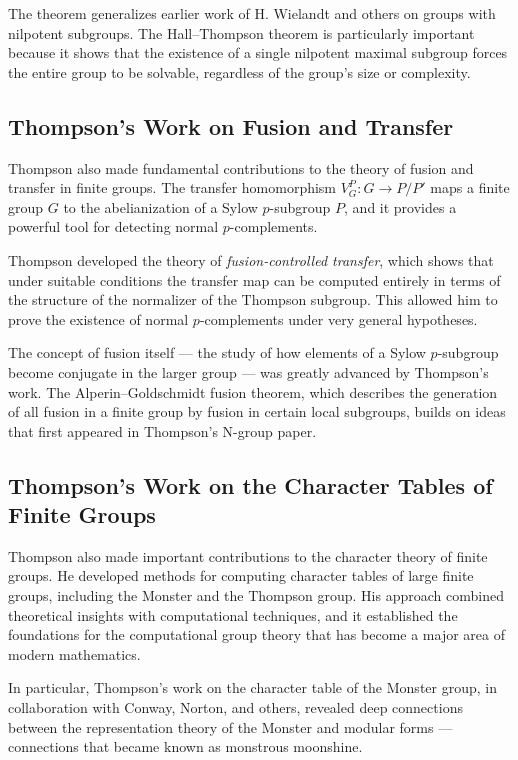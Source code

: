 The theorem generalizes earlier work of H. Wielandt and others on groups with nilpotent subgroups. The Hall--Thompson theorem is particularly important because it shows that the existence of a single nilpotent maximal subgroup forces the entire group to be solvable, regardless of the group's size or complexity.

\subsection{Thompson's Work on Fusion and Transfer}

Thompson also made fundamental contributions to the theory of fusion and transfer in finite groups. The transfer homomorphism \(V_G^P: G \to P/P'\) maps a finite group \(G\) to the abelianization of a Sylow \(p\)-subgroup \(P\), and it provides a powerful tool for detecting normal \(p\)-complements.

Thompson developed the theory of \textit{fusion-controlled transfer}, which shows that under suitable conditions the transfer map can be computed entirely in terms of the structure of the normalizer of the Thompson subgroup. This allowed him to prove the existence of normal \(p\)-complements under very general hypotheses.

The concept of fusion itself --- the study of how elements of a Sylow \(p\)-subgroup become conjugate in the larger group --- was greatly advanced by Thompson's work. The Alperin--Goldschmidt fusion theorem, which describes the generation of all fusion in a finite group by fusion in certain local subgroups, builds on ideas that first appeared in Thompson's N-group paper.

\subsection{Thompson's Work on the Character Tables of Finite Groups}

Thompson also made important contributions to the character theory of finite groups. He developed methods for computing character tables of large finite groups, including the Monster and the Thompson group. His approach combined theoretical insights with computational techniques, and it established the foundations for the computational group theory that has become a major area of modern mathematics.

In particular, Thompson's work on the character table of the Monster group, in collaboration with Conway, Norton, and others, revealed deep connections between the representation theory of the Monster and modular forms --- connections that became known as monstrous moonshine.

